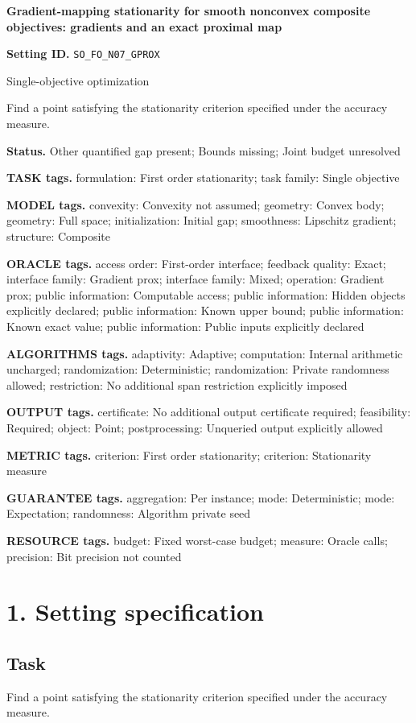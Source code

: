 \documentclass[10pt,a4paper]{article}
\begin{document}
\raggedright

{\LARGE\bfseries\sffamily\color{AtlasNavy} Gradient-mapping stationarity for smooth nonconvex composite objectives: gradients and an exact proximal map\par}\vspace{5pt}
\textbf{Setting ID.} \texttt{SO\_\allowbreak{}FO\_\allowbreak{}N07\_\allowbreak{}GPROX}

Single-objective optimization

Find a point satisfying the stationarity criterion specified under the accuracy measure.

\textbf{Status.} Other quantified gap present; Bounds missing; Joint budget unresolved

\textbf{TASK tags.} formulation: First order stationarity; task family: Single objective

\textbf{MODEL tags.} convexity: Convexity not assumed; geometry: Convex body; geometry: Full space; initialization: Initial gap; smoothness: Lipschitz gradient; structure: Composite

\textbf{ORACLE tags.} access order: First-order interface; feedback quality: Exact; interface family: Gradient prox; interface family: Mixed; operation: Gradient prox; public information: Computable access; public information: Hidden objects explicitly declared; public information: Known upper bound; public information: Known exact value; public information: Public inputs explicitly declared

\textbf{ALGORITHMS tags.} adaptivity: Adaptive; computation: Internal arithmetic uncharged; randomization: Deterministic; randomization: Private randomness allowed; restriction: No additional span restriction explicitly imposed

\textbf{OUTPUT tags.} certificate: No additional output certificate required; feasibility: Required; object: Point; postprocessing: Unqueried output explicitly allowed

\textbf{METRIC tags.} criterion: First order stationarity; criterion: Stationarity measure

\textbf{GUARANTEE tags.} aggregation: Per instance; mode: Deterministic; mode: Expectation; randomness: Algorithm private seed

\textbf{RESOURCE tags.} budget: Fixed worst-case budget; measure: Oracle calls; precision: Bit precision not counted

\section{1. Setting specification}
\subsection{Task}
Find a point satisfying the stationarity criterion specified under the accuracy measure.
\end{document}
